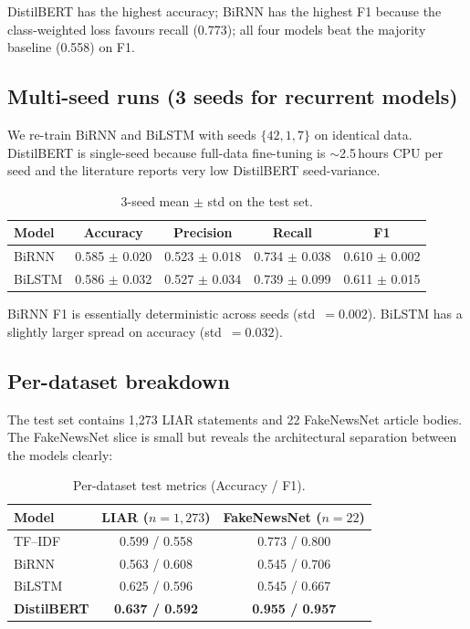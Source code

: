 \documentclass{article}
\begin{document}
DistilBERT has the highest accuracy; BiRNN has the highest F1 because the class-weighted loss favours recall (0.773); all four models beat the majority baseline (0.558) on F1.

\subsection{Multi-seed runs (3 seeds for recurrent models)}
We re-train BiRNN and BiLSTM with seeds $\{42, 1, 7\}$ on identical data. DistilBERT is single-seed because full-data fine-tuning is $\sim$2.5\,hours CPU per seed and the literature reports very low DistilBERT seed-variance.

\begin{table}[h]
\centering
\caption{3-seed mean $\pm$ std on the test set.}
\label{tab:multiseed}
\begin{tabular}{lcccc}
\toprule
Model & Accuracy & Precision & Recall & F1 \\
\midrule
BiRNN  & 0.585 $\pm$ 0.020 & 0.523 $\pm$ 0.018 & 0.734 $\pm$ 0.038 & 0.610 $\pm$ 0.002 \\
BiLSTM & 0.586 $\pm$ 0.032 & 0.527 $\pm$ 0.034 & 0.739 $\pm$ 0.099 & 0.611 $\pm$ 0.015 \\
\bottomrule
\end{tabular}
\end{table}

BiRNN F1 is essentially deterministic across seeds (std~$=0.002$). BiLSTM has a slightly larger spread on accuracy (std~$=0.032$).

\subsection{Per-dataset breakdown}
The test set contains 1{,}273 LIAR statements and 22 FakeNewsNet article bodies. The FakeNewsNet slice is small but reveals the architectural separation between the models clearly:

\begin{table}[h]
\centering
\caption{Per-dataset test metrics (Accuracy / F1).}
\label{tab:persource}
\begin{tabular}{lcc}
\toprule
Model & LIAR ($n=1{,}273$) & FakeNewsNet ($n=22$) \\
\midrule
TF--IDF       & 0.599 / 0.558 & 0.773 / 0.800 \\
BiRNN         & 0.563 / 0.608 & 0.545 / 0.706 \\
BiLSTM        & 0.625 / 0.596 & 0.545 / 0.667 \\
\textbf{DistilBERT}   & \textbf{0.637 / 0.592} & \textbf{0.955 / 0.957} \\
\bottomrule
\end{tabular}
\end{table}
\end{document}
